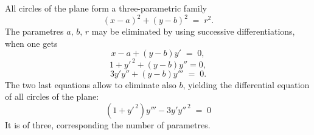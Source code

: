 \documentclass[12pt]{article}
\theoremstyle{definition}
\begin{document}
All circles of the plane form a three-parametric family
$$(x-a)^2+(y-b)^2 \;=\; r^2.$$
The parametres $a,\,b,\,r$ may be eliminated by using successive differentiations, when one gets
$$x-a+(y-b)y' \;=\; 0,$$ 
$$1+y'^{\,2}+(y-b)y'' = 0,$$
$$3y'y''+(y-b)y''' \;=\; 0.$$
The two last equations allow to eliminate also $b$, yielding
the differential equation of all circles of the plane:
$$(1+y'^{\,2})y'''-3y'y''^{\,2} \;=\; 0$$
It is of  three, corresponding the number of parametres.

\end{document}
